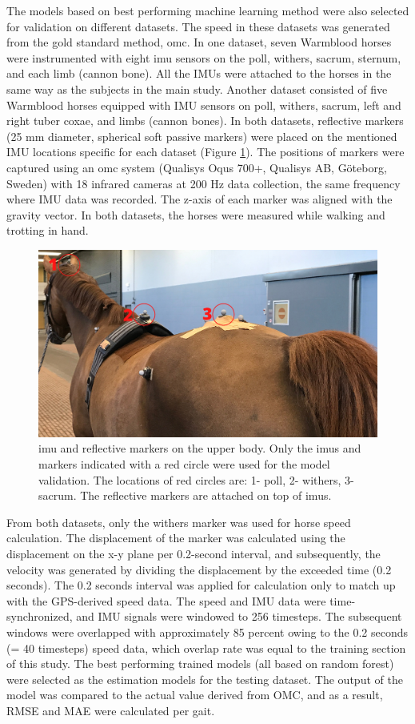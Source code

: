 The models based on best performing machine learning method were also selected for validation on different datasets. The speed in these datasets was generated from the gold standard method, \gls{omc}. In one dataset, seven Warmblood horses were instrumented with eight \gls{imu} sensors on the poll, withers, sacrum, sternum, and each limb (cannon bone). All the IMUs were attached to the horses in the same way as the subjects in the main study. Another dataset consisted of five Warmblood horses equipped with IMU sensors on poll, withers, sacrum, left and right tuber coxae, and limbs (cannon bones). In both datasets, reflective markers (25 mm diameter, spherical soft passive markers) were placed on the mentioned IMU locations specific for each dataset (Figure \ref{imumocap}). The positions of markers were captured using an \gls{omc} system (Qualisys Oqus 700+, Qualisys AB, Göteborg, Sweden) with 18 infrared cameras at 200 Hz data collection, the same frequency where IMU data was recorded. The z-axis of each marker was aligned with the gravity vector. In both datasets, the horses were measured while walking and trotting in hand. 

\begin{figure}[htbp]
\centering
\includegraphics[width=.95\linewidth]{chapters/Speed/figures/IMU_Mocap_HQ.png}
\caption{\gls{imu} and reflective markers on the upper body. Only the \gls{imu}s and markers indicated with a red circle were used for the model validation. The locations of red circles are: 1- poll, 2- withers, 3- sacrum. The reflective markers are attached on top of \gls{imu}s.}
\label{imumocap}
\end{figure}

From both datasets, only the withers marker was used for horse speed calculation. The displacement of the marker was calculated using the displacement on the x-y plane per 0.2-second interval, and subsequently, the velocity was generated by dividing the displacement by the exceeded time (0.2 seconds). The 0.2 seconds interval was applied for calculation only to match up with the GPS-derived speed data. The speed and IMU data were time-synchronized, and IMU signals were windowed to 256 timesteps. The subsequent windows were overlapped with approximately 85 percent owing to the 0.2 seconds (= 40 timesteps) speed data, which overlap rate was equal to the training section of this study. 
The best performing trained models (all based on random forest) were selected as the estimation models for the testing dataset. The output of the model was compared to the actual value derived from OMC, and as a result, RMSE and MAE were calculated per gait.


